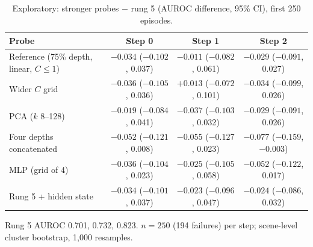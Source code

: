 \begin{table}[htbp]
\centering\small
\caption{Exploratory: stronger probes $-$ rung 5 (AUROC difference, 95\% CI), first 250 episodes.}\label{tab:strength}
\begin{tabularx}{\linewidth}{@{}Lccc@{}}
\toprule
Probe & Step 0 & Step 1 & Step 2 \\
\midrule
Reference (75\% depth, linear, $C \le 1$) & $-0.034$ ($-0.102$, 0.037) & $-0.011$ ($-0.082$, 0.061) & $-0.029$ ($-0.091$, 0.027) \\
Wider $C$ grid & $-0.036$ ($-0.105$, 0.036) & $+0.013$ ($-0.072$, 0.101) & $-0.034$ ($-0.099$, 0.026) \\
PCA ($k$ 8--128) & $-0.019$ ($-0.084$, 0.041) & $-0.037$ ($-0.103$, 0.032) & $-0.029$ ($-0.091$, 0.026) \\
Four depths concatenated & $-0.052$ ($-0.121$, 0.008) & $-0.055$ ($-0.127$, 0.023) & $-0.077$ ($-0.159$, $-0.003$) \\
MLP (grid of 4) & $-0.036$ ($-0.104$, 0.023) & $-0.025$ ($-0.105$, 0.058) & $-0.052$ ($-0.122$, 0.017) \\
Rung 5 + hidden state & $-0.034$ ($-0.101$, 0.037) & $-0.023$ ($-0.096$, 0.047) & $-0.024$ ($-0.086$, 0.032) \\
\bottomrule
\end{tabularx}
\par\smallskip\raggedright\footnotesize
Rung 5 AUROC 0.701, 0.732, 0.823. $n = 250$ (194 failures) per step; scene-level cluster bootstrap, 1,000 resamples.
\end{table}
